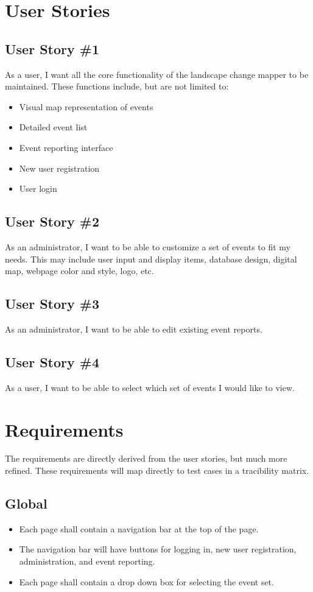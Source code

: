 \section{User Stories}

\subsection{User Story \#1}
As a user, I want all the core functionality of the landscape change mapper to be maintained. These functions include, but are not limited to:
\begin{itemize}
\item Visual map representation of events
\item Detailed event list
\item Event reporting interface
\item New user registration
\item User login
\end{itemize}

\subsection{User Story \#2} 
As an administrator, I want to be able to customize a set of events to fit my needs. This may include user input and display items, database design, digital map, webpage color and style, logo, etc. 

\subsection{User Story \#3} 
As an administrator, I want to be able to edit existing event reports.

\subsection{User Story \#4} 
As a user, I want to be able to select which set of events I would like to view.

\section{Requirements}
The requirements are directly derived from the user stories, but much more refined. These requirements will map directly to test cases in a tracibility matrix.

\subsection{Global}
\begin{itemize}
\item Each page shall contain a navigation bar at the top of the page.
\item The navigation bar will have buttons for logging in, new user registration, administration, and event reporting.
\item Each page shall contain a drop down box for selecting the event set.
\end{itemize}

